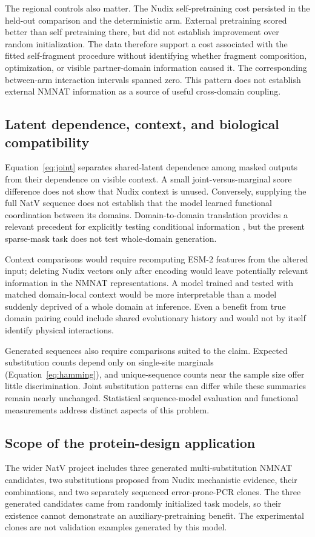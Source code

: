 \documentclass[referee,pdflatex,sn-vancouver-num]{sn-jnl}
\begin{document}
The regional controls also matter. The Nudix self-pretraining cost persisted in the held-out comparison and the deterministic arm. External pretraining scored better than self pretraining there, but did not establish improvement over random initialization. The data therefore support a cost associated with the fitted self-fragment procedure without identifying whether fragment composition, optimization, or visible partner-domain information caused it. The corresponding between-arm interaction intervals spanned zero. This pattern does not establish external NMNAT information as a source of useful cross-domain coupling.

\subsection{Latent dependence, context, and biological compatibility}
Equation~\ref{eq:joint} separates shared-latent dependence among masked outputs from their dependence on visible context. A small joint-versus-marginal score difference does not show that Nudix context is unused. Conversely, supplying the full NatV sequence does not establish that the model learned functional coordination between its domains. Domain-to-domain translation provides a relevant precedent for explicitly testing conditional information \cite{meynard2023}, but the present sparse-mask task does not test whole-domain generation.

Context comparisons would require recomputing ESM-2 features from the altered input; deleting Nudix vectors only after encoding would leave potentially relevant information in the NMNAT representations. A model trained and tested with matched domain-local context would be more interpretable than a model suddenly deprived of a whole domain at inference. Even a benefit from true domain pairing could include shared evolutionary history and would not by itself identify physical interactions.

Generated sequences also require comparisons suited to the claim. Expected substitution counts depend only on single-site marginals (Equation~\ref{eq:hamming}), and unique-sequence counts near the sample size offer little discrimination. Joint substitution patterns can differ while these summaries remain nearly unchanged. Statistical sequence-model evaluation \cite{mcgee2021} and functional measurements \cite{hawkins2021,praljak2023} address distinct aspects of this problem.

\subsection{Scope of the protein-design application}
The wider NatV project includes three generated multi-substitution NMNAT candidates, two substitutions proposed from Nudix mechanistic evidence, their combinations, and two separately sequenced error-prone-PCR clones. The three generated candidates came from randomly initialized task models, so their existence cannot demonstrate an auxiliary-pretraining benefit. The experimental clones are not validation examples generated by this model.
\end{document}
